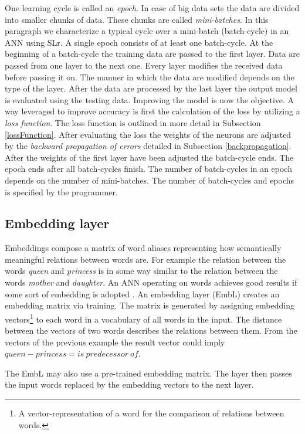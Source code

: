 One learning cycle is called an \textit{epoch}. In case of big data sets the data are divided into smaller chunks of data. These chunks are called \textit{mini-batches}. In this paragraph we characterize a typical cycle over a mini-batch (batch-cycle) in an ANN using SLr. A single epoch consists of at least one batch-cycle. At the beginning of a batch-cycle the training data are passed to the first layer. Data are passed from one layer to the next one. Every layer modifies the received data before passing it on. The manner in which the data are modified depends on the type of the layer. After the data are processed by the last layer the output model is evaluated using the testing data. Improving the model is now the objective. A way leveraged to improve accuracy is first the calculation of the loss by utilizing a \textit{loss function}. The loss function is outlined in more detail in Subsection \ref{lossFunction}. After evaluating the loss the weights of the neurons are adjusted by the \textit{backward propagation of errors} detailed in Subsection \ref{backpropagation}. After the weights of the first layer have been adjusted the batch-cycle ends. The epoch ends after all batch-cycles finish. The number of batch-cycles in an epoch depends on the number of mini-batches. The number of batch-cycles and epochs is specified by the programmer. 

\subsection{Embedding layer}\label{embeddingLayers}
Embeddings \cite{embeddingsOverview} compose a matrix of word aliases representing how semantically meaningful relations between words are. For example the relation between the words \textit{queen} and \textit{princess} is in some way similar to the relation between the words \textit{mother} and \textit{daughter}. An ANN operating on words achieves good results if some sort of embedding is adopted \cite{goodToUseEmbeddings}. An embedding layer (EmbL) creates an embedding matrix via training. The matrix is generated by assigning embedding vectors\footnote{A vector-representation of a word for the comparison of relations between words.} to each word in a vocabulary of all words in the input. The distance between the vectors of two words describes the relations between them. From the vectors of the previous example the result vector could imply $queen - princess = is~predecessor~of$. 

The EmbL may also use a pre-trained embedding matrix. The layer then passes the input words replaced by the embedding vectors to the next layer. 

